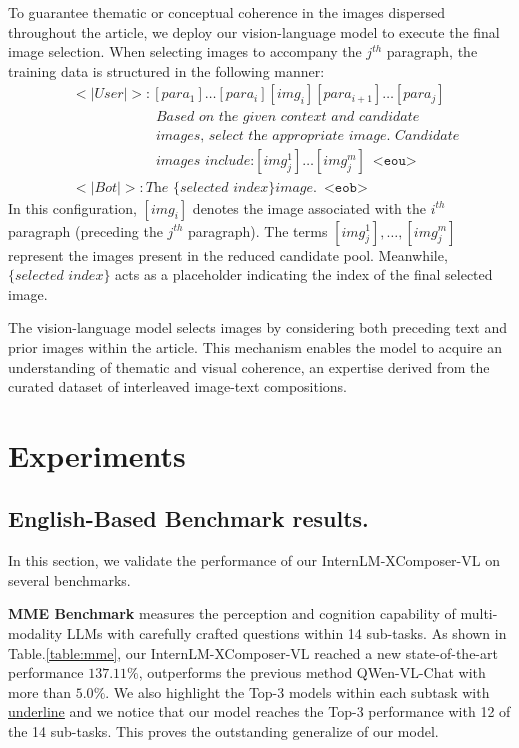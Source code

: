\documentclass[10pt,twocolumn,letterpaper]{article}
\begin{document}
To guarantee thematic or conceptual coherence in the images dispersed throughout the article, we deploy our vision-language model to execute the final image selection. When selecting images to accompany the \( j^{th} \) paragraph, the training data is structured in the following manner:
\begin{align*}
& <|User|>: [para_1]\ldots[para_i][img_i][para_{i+1}]\ldots[para_j] \\
& \quad\quad\quad\quad\quad\quad \textit{Based on the given context and candidate} \\
& \quad\quad\quad\quad\quad\quad \textit{images, select the appropriate image. Candidate} \\
& \quad\quad\quad\quad\quad\quad \textit{images include:} [img_j^1]\ldots[img_j^m]\enspace \texttt{<eou>}  \\
& <|Bot|>: \textit{The \{selected index\} image.} \enspace \texttt{<eob>}
\end{align*}
In this configuration, \( [img_i] \) denotes the image associated with the \( i^{th} \) paragraph (preceding the \( j^{th} \) paragraph). The terms \( [img_j^1], \ldots, [img_j^m] \) represent the images present in the reduced candidate pool. Meanwhile, \( \{\textit{selected index}\} \) acts as a placeholder indicating the index of the final selected image.

The vision-language model selects images by considering both preceding text and prior images within the article. This mechanism enables the model to acquire an understanding of thematic and visual coherence, an expertise derived from the curated dataset of interleaved image-text compositions. \section{Experiments}

\subsection{English-Based Benchmark results.}

In this section, we validate the performance of our InternLM-XComposer-VL on several benchmarks. 

\noindent\textbf{MME Benchmark} measures the perception and cognition capability of multi-modality LLMs with carefully crafted questions within 14 sub-tasks. As shown in Table.\ref{table:mme}, our InternLM-XComposer-VL reached a new state-of-the-art performance $137.11\%$, outperforms the previous method QWen-VL-Chat with more than $5.0\%$. We also highlight the Top-3 models within each subtask with \underline{underline} and we notice that our model reaches the Top-3 performance with 12 of the 14 sub-tasks. This proves the outstanding generalize of our model.
\end{document}

